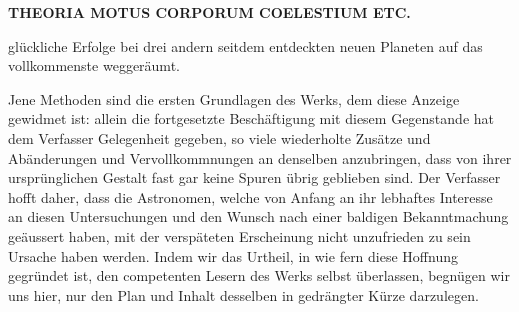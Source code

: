 \par\clearpage
\begingroup
\pagestyle{empty}
\newcommand{\GaussVIGathering}[2]{%
  \fancypagestyle{gaussVIGathering}{%
    \fancyhf{}%
    \renewcommand{\headrulewidth}{0pt}%
    \renewcommand{\footrulewidth}{0pt}%
    \fancyfoot[C]{\makebox[\textwidth][l]{%
      \hspace*{.025\textwidth}{\footnotesize\bfseries #1}\hfill
      {\normalsize\bfseries\textls[90]{#2}}\hspace*{.18\textwidth}}}%
  }%
  \thispagestyle{gaussVIGathering}%
}
\thispagestyle{empty}
\noindent{}%
\makebox[12mm][l]{}%
\parbox[t]{\dimexpr\linewidth-24mm\relax}{\centering\footnotesize\bfseries THEORIA MOTUS CORPORUM COELESTIUM ETC.\par}%
\par\nobreak\medskip
\noindent glückliche Erfolge bei drei andern seitdem entdeckten neuen Planeten auf das vollkommenste weggeräumt.

Jene Methoden sind die ersten Grundlagen des Werks, dem diese Anzeige gewidmet ist: allein die fortgesetzte Beschäftigung mit diesem Gegenstande hat dem Verfasser Gelegenheit gegeben, so viele wiederholte Zusätze und Abänderungen und Vervollkommnungen an denselben anzubringen, dass von ihrer ursprünglichen Gestalt fast gar keine Spuren übrig geblieben sind. Der Verfasser hofft daher, dass die Astronomen, welche von Anfang an ihr lebhaftes Interesse an diesen Untersuchungen und den Wunsch nach einer baldigen Bekanntmachung geäussert haben, mit der verspäteten Erscheinung nicht unzufrieden zu sein Ursache haben werden. Indem wir das Urtheil, in wie fern diese Hoffnung gegründet ist, den competenten Lesern des Werks selbst überlassen, begnügen wir uns hier, nur den Plan und Inhalt desselben in gedrängter Kürze darzulegen.

